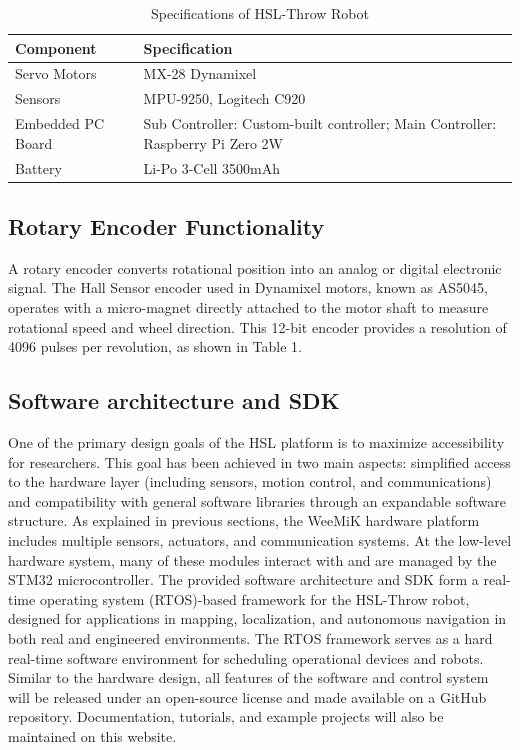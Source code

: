 \documentclass[conference]{IEEEtran}
\begin{document}
\begin{table}[htbp]
\centering
\caption{Specifications of HSL-Throw Robot}
\begin{tabular}{|p{3cm}|p{5cm}|}
\hline
\textbf{Component}         & \textbf{Specification} \\ \hline
Servo Motors               & MX-28 Dynamixel      \\ \hline
Sensors                    & MPU-9250, Logitech C920 \\ \hline
Embedded PC Board          & Sub Controller: Custom-built controller; Main Controller: Raspberry Pi Zero 2W \\ \hline
Battery                    & Li-Po 3-Cell 3500mAh    \\ \hline
\end{tabular}
\label{tab:hsl_locomotion}
\end{table}

\subsection{Rotary Encoder Functionality}
A rotary encoder converts rotational position into an analog or digital electronic signal. The Hall Sensor encoder used in Dynamixel motors, known as AS5045, operates with a micro-magnet directly attached to the motor shaft to measure rotational speed and wheel direction. This 12-bit encoder provides a resolution of 4096 pulses per revolution, as shown in Table 1.

\subsection{Software architecture and SDK}
One of the primary design goals of the HSL platform is to maximize accessibility for researchers. This goal has been achieved in two main aspects: simplified access to the hardware layer (including sensors, motion control, and communications) and compatibility with general software libraries through an expandable software structure. As explained in previous sections, the WeeMiK hardware platform includes multiple sensors, actuators, and communication systems. At the low-level hardware system, many of these modules interact with and are managed by the STM32 microcontroller. The provided software architecture and SDK form a real-time operating system (RTOS)-based framework for the HSL-Throw robot, designed for applications in mapping, localization, and autonomous navigation in both real and engineered environments. The RTOS framework serves as a hard real-time software environment for scheduling operational devices and robots. Similar to the hardware design, all features of the software and control system will be released under an open-source license and made available on a GitHub repository. Documentation, tutorials, and example projects will also be maintained on this website.
\end{document}
